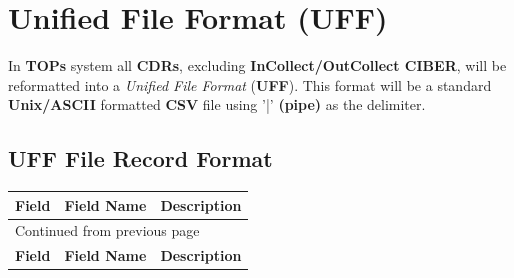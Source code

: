 \documentclass[12pt,twoside]{article}
\begin{document}
\section{Unified File Format (UFF)}
\label{sec:orgheadline38}
In \textbf{TOPs} system all \textbf{CDRs}, excluding \textbf{InCollect/OutCollect CIBER},
will be reformatted into a \emph{Unified File Format} (\textbf{UFF}). This format
will be a standard \textbf{Unix/ASCII} formatted \textbf{CSV} file using '|'
\textbf{(pipe)} as the delimiter.
\subsection{UFF File Record Format}
\label{sec:orgheadline33}
\footnotesize

\begin{longtable}{c|l|l}
\hline
\textbf{Field} & \textbf{Field Name} & \textbf{Description}\\
\hline
\endfirsthead
\multicolumn{3}{l}{Continued from previous page} \\
\hline

\textbf{Field} & \textbf{Field Name} & \textbf{Description} \\


\end{longtable}
\end{document}
